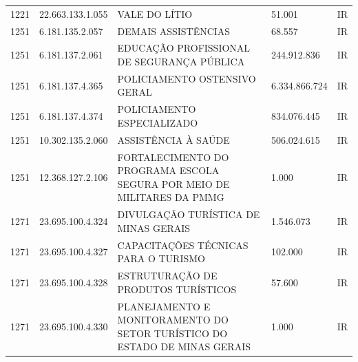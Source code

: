 \documentclass{article}
\begin{document}
\begin{longtable}[c]{m{1cm}|m{2cm}|m{10cm}|m{2cm}|m{1cm}}
\multicolumn{1}{C{1cm}|}{1221} & \multicolumn{1}{C{2cm}|}{22.663.133.1.055} & \multicolumn{1}{L{10cm}|}{VALE DO LÍTIO} & \multicolumn{1}{R{2cm}|}{51.001} & \multicolumn{1}{C{1cm}}{IR} \\
\multicolumn{1}{C{1cm}|}{1251} & \multicolumn{1}{C{2cm}|}{6.181.135.2.057} & \multicolumn{1}{L{10cm}|}{DEMAIS ASSISTÊNCIAS} & \multicolumn{1}{R{2cm}|}{68.557} & \multicolumn{1}{C{1cm}}{IR} \\
\multicolumn{1}{C{1cm}|}{1251} & \multicolumn{1}{C{2cm}|}{6.181.137.2.061} & \multicolumn{1}{L{10cm}|}{EDUCAÇÃO PROFISSIONAL DE SEGURANÇA PÚBLICA} & \multicolumn{1}{R{2cm}|}{244.912.836} & \multicolumn{1}{C{1cm}}{IR} \\
\multicolumn{1}{C{1cm}|}{1251} & \multicolumn{1}{C{2cm}|}{6.181.137.4.365} & \multicolumn{1}{L{10cm}|}{POLICIAMENTO OSTENSIVO GERAL} & \multicolumn{1}{R{2cm}|}{6.334.866.724} & \multicolumn{1}{C{1cm}}{IR} \\
\multicolumn{1}{C{1cm}|}{1251} & \multicolumn{1}{C{2cm}|}{6.181.137.4.374} & \multicolumn{1}{L{10cm}|}{POLICIAMENTO ESPECIALIZADO} & \multicolumn{1}{R{2cm}|}{834.076.445} & \multicolumn{1}{C{1cm}}{IR} \\
\multicolumn{1}{C{1cm}|}{1251} & \multicolumn{1}{C{2cm}|}{10.302.135.2.060} & \multicolumn{1}{L{10cm}|}{ASSISTÊNCIA À SAÚDE} & \multicolumn{1}{R{2cm}|}{506.024.615} & \multicolumn{1}{C{1cm}}{IR} \\
\multicolumn{1}{C{1cm}|}{1251} & \multicolumn{1}{C{2cm}|}{12.368.127.2.106} & \multicolumn{1}{L{10cm}|}{FORTALECIMENTO DO PROGRAMA ESCOLA SEGURA POR MEIO DE MILITARES DA PMMG} & \multicolumn{1}{R{2cm}|}{1.000} & \multicolumn{1}{C{1cm}}{IR} \\
\multicolumn{1}{C{1cm}|}{1271} & \multicolumn{1}{C{2cm}|}{23.695.100.4.324} & \multicolumn{1}{L{10cm}|}{DIVULGAÇÃO TURÍSTICA DE MINAS GERAIS} & \multicolumn{1}{R{2cm}|}{1.546.073} & \multicolumn{1}{C{1cm}}{IR} \\
\multicolumn{1}{C{1cm}|}{1271} & \multicolumn{1}{C{2cm}|}{23.695.100.4.327} & \multicolumn{1}{L{10cm}|}{CAPACITAÇÕES TÉCNICAS PARA O TURISMO} & \multicolumn{1}{R{2cm}|}{102.000} & \multicolumn{1}{C{1cm}}{IR} \\
\multicolumn{1}{C{1cm}|}{1271} & \multicolumn{1}{C{2cm}|}{23.695.100.4.328} & \multicolumn{1}{L{10cm}|}{ESTRUTURAÇÃO DE PRODUTOS TURÍSTICOS} & \multicolumn{1}{R{2cm}|}{57.600} & \multicolumn{1}{C{1cm}}{IR} \\
\multicolumn{1}{C{1cm}|}{1271} & \multicolumn{1}{C{2cm}|}{23.695.100.4.330} & \multicolumn{1}{L{10cm}|}{PLANEJAMENTO E MONITORAMENTO DO SETOR TURÍSTICO DO ESTADO DE MINAS GERAIS} & \multicolumn{1}{R{2cm}|}{1.000} & \multicolumn{1}{C{1cm}}{IR} \\

\end{longtable}
\end{document}
